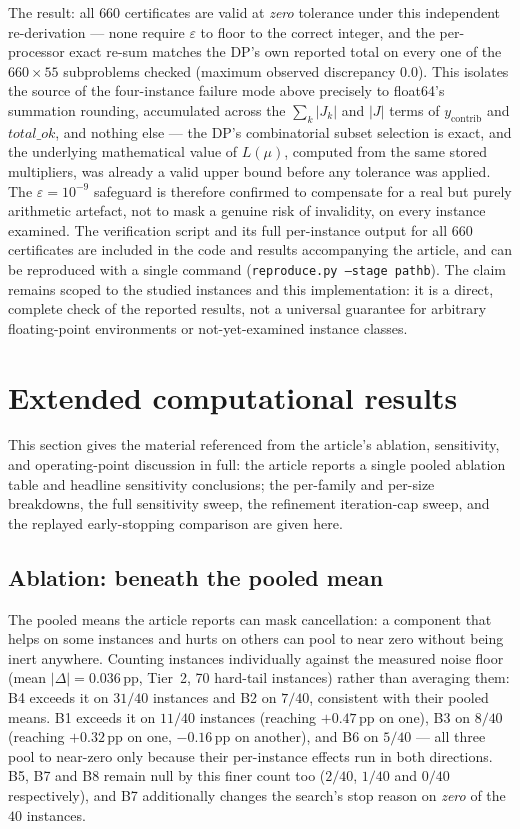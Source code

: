 \documentclass[11pt]{article}
\begin{document}
The result: all $660$ certificates are valid at \emph{zero} tolerance under this
independent re-derivation --- none require $\varepsilon$ to floor to the correct
integer, and the per-processor exact re-sum matches the DP's own reported total
on every one of the $660\times 55$ subproblems checked (maximum observed
discrepancy $0.0$). This isolates the source of the four-instance failure mode
above precisely to float64's summation rounding, accumulated across the
$\sum_k|J_k|$ and $|J|$ terms of $y_{\text{contrib}}$ and $\textit{total\_ok}$,
and nothing else --- the DP's combinatorial subset selection is exact, and the
underlying mathematical value of $L(\mu)$, computed from the same stored
multipliers, was already a valid upper bound before any tolerance was applied.
The $\varepsilon=10^{-9}$ safeguard is therefore confirmed to compensate for a
real but purely arithmetic artefact, not to mask a genuine risk of invalidity,
on every instance examined. The verification script and its full per-instance
output for all $660$ certificates are included in the code and results
accompanying the article, and can be reproduced with a single command
(\texttt{reproduce.py --stage pathb}). The claim remains scoped to the studied
instances and this implementation: it is a direct, complete check of the
reported results, not a universal guarantee for arbitrary floating-point
environments or not-yet-examined instance classes.

\section{Extended computational results}
\label{sec:supp-extended}

This section gives the material referenced from the article's ablation,
sensitivity, and operating-point discussion in full: the article reports a
single pooled ablation table and headline sensitivity conclusions; the
per-family and per-size breakdowns, the full sensitivity sweep, the refinement
iteration-cap sweep, and the replayed early-stopping comparison are given here.

\subsection{Ablation: beneath the pooled mean}

The pooled means the article reports can mask cancellation: a component that
helps on some instances and hurts on others can pool to near zero without being
inert anywhere. Counting instances individually against the measured noise
floor (mean $|\Delta|=0.036$\,pp, Tier~2, 70 hard-tail instances) rather than
averaging them: B4 exceeds it on $31/40$ instances and B2 on $7/40$, consistent
with their pooled means. B1 exceeds it on $11/40$ instances (reaching
$+0.47$\,pp on one), B3 on $8/40$ (reaching $+0.32$\,pp on one, $-0.16$\,pp on
another), and B6 on $5/40$ --- all three pool to near-zero only because their
per-instance effects run in both directions. B5, B7 and B8 remain null by this
finer count too ($2/40$, $1/40$ and $0/40$ respectively), and B7 additionally
changes the search's stop reason on \emph{zero} of the $40$ instances.
\end{document}
